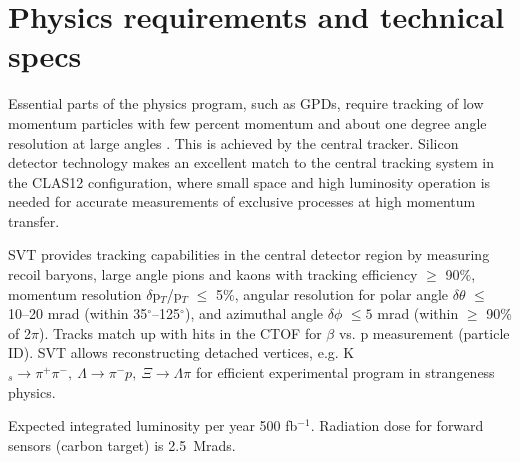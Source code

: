 \section{Physics requirements and technical specs}

Essential parts of the physics program, such as GPDs, require tracking of low momentum  particles with few percent momentum and about one degree angle resolution at large angles \cite{TDR12}. This is achieved by the central tracker.  
Silicon detector technology makes an excellent match to the central tracking system in the CLAS12 configuration, where small space and high luminosity operation is needed for accurate measurements of exclusive processes at high momentum transfer.

SVT provides tracking capabilities in the central detector region by measuring recoil baryons, large angle pions and kaons with tracking efficiency $\ge$ 90$\%$, momentum resolution $\delta$p$_{T}$/p$_{T}$ $\le$ 5$\%$, angular resolution for polar angle $\delta$$\theta$ $\le$ 10--20 mrad (within 35$^\circ$--125$^\circ$), and azimuthal angle $\delta$$\phi$ $\le5$ mrad (within $\ge$ 90$\%$ of 2$\pi$). Tracks match up with hits in the CTOF for $\beta$ vs. p measurement (particle ID). SVT allows reconstructing detached vertices, e.g. K$_{s}\!\to\!\pi^{+}\pi^{-},~\Lambda\!\to\!\pi^{-}p,~\Xi\!\to\!\Lambda\pi$ for efficient experimental program in strangeness physics.  

Expected integrated luminosity per year 500 fb$^{-1}$. Radiation dose for forward sensors (carbon target) is 2.5~Mrads.

